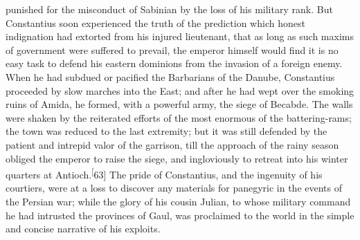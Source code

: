 punished for the misconduct of Sabinian by the loss of his
military rank. But Constantius soon experienced the truth of the
prediction which honest indignation had extorted from his injured
lieutenant, that as long as such maxims of government were
suffered to prevail, the emperor himself would find it is no easy
task to defend his eastern dominions from the invasion of a
foreign enemy. When he had subdued or pacified the Barbarians of
the Danube, Constantius proceeded by slow marches into the East;
and after he had wept over the smoking ruins of Amida, he formed,
with a powerful army, the siege of Becabde. The walls were shaken
by the reiterated efforts of the most enormous of the
battering-rams; the town was reduced to the last extremity; but
it was still defended by the patient and intrepid valor of the
garrison, till the approach of the rainy season obliged the
emperor to raise the siege, and ingloviously to retreat into his
winter quarters at Antioch.\textsuperscript[63] The pride of Constantius, and the
ingenuity of his courtiers, were at a loss to discover any
materials for panegyric in the events of the Persian war; while
the glory of his cousin Julian, to whose military command he had
intrusted the provinces of Gaul, was proclaimed to the world in
the simple and concise narrative of his exploits.



